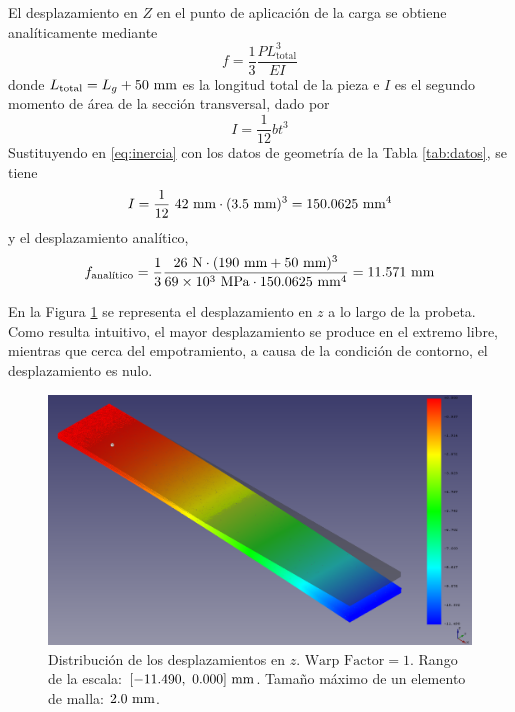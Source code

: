 El desplazamiento en $Z$ en el punto de aplicación de la carga se obtiene analíticamente mediante
\begin{equation} \label{eq:desplazamiento_total_z}
    f = \frac{1}{3} \frac{P L_\text{total}^3}{E I}
\end{equation}
donde $L_\text{total} = L_g + 50 \ \milli\meter$ es la longitud total de la pieza e $I$ es el segundo momento de área de la sección transversal, dado por
\begin{equation} \label{eq:inercia}
    I = \frac{1}{12} b t^3
\end{equation}
Sustituyendo en \eqref{eq:inercia} con los datos de geometría de la Tabla \ref{tab:datos}, se tiene
\[
    I = 
    \frac{1}{12} \ 42 \ \milli\meter \cdot (3.5 \ \milli\meter)^3 = 
    150.0625 \ {\milli\meter}^4
\]
y el desplazamiento analítico,
\[
    f_\text{analítico} = 
    \frac{1}{3} 
    \frac{26 \ \newton \cdot (190 \ \milli\meter + 50 \ \milli\meter)^3}{69 \times 10^{3} \ \mega\pascal \cdot 150.0625 \ {\milli\meter}^4} = 
    11.571 \ \milli\meter
\]

En la Figura \ref{fig:displacement_vector_z_20_3d} se representa el desplazamiento en $z$ a lo largo de la probeta. Como resulta intuitivo, el mayor desplazamiento se produce en el extremo libre, mientras que cerca del empotramiento, a causa de la condición de contorno, el desplazamiento es nulo.
\begin{figure}[H]
    \centering
    \includegraphics[width=\textwidth]{figures/resultados/displacement_vector_z_20_3d.pdf}
    \caption{Distribución de los desplazamientos en $z$. $\text{Warp Factor} = 1$. Rango de la escala: $[-11.490, \ 0.000] \ \milli\meter$. Tamaño máximo de un elemento de malla: $2.0 \ \milli\meter$.}
    \label{fig:displacement_vector_z_20_3d}
\end{figure}

